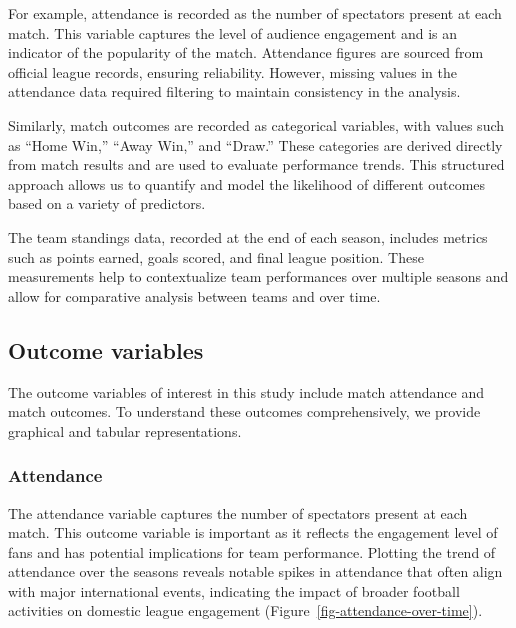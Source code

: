 \documentclass[
  letterpaper,
  DIV=11,
  numbers=noendperiod]{scrartcl}
\begin{document}
For example, attendance is recorded as the number of spectators present
at each match. This variable captures the level of audience engagement
and is an indicator of the popularity of the match. Attendance figures
are sourced from official league records, ensuring reliability. However,
missing values in the attendance data required filtering to maintain
consistency in the analysis.

Similarly, match outcomes are recorded as categorical variables, with
values such as ``Home Win,'' ``Away Win,'' and ``Draw.'' These
categories are derived directly from match results and are used to
evaluate performance trends. This structured approach allows us to
quantify and model the likelihood of different outcomes based on a
variety of predictors.

The team standings data, recorded at the end of each season, includes
metrics such as points earned, goals scored, and final league position.
These measurements help to contextualize team performances over multiple
seasons and allow for comparative analysis between teams and over time.

\hypertarget{outcome-variables}{%
\subsection{Outcome variables}\label{outcome-variables}}

The outcome variables of interest in this study include match attendance
and match outcomes. To understand these outcomes comprehensively, we
provide graphical and tabular representations.

\hypertarget{attendance}{%
\subsubsection{Attendance}\label{attendance}}

The attendance variable captures the number of spectators present at
each match. This outcome variable is important as it reflects the
engagement level of fans and has potential implications for team
performance. Plotting the trend of attendance over the seasons reveals
notable spikes in attendance that often align with major international
events, indicating the impact of broader football activities on domestic
league engagement (Figure~\ref{fig-attendance-over-time}).
\end{document}
